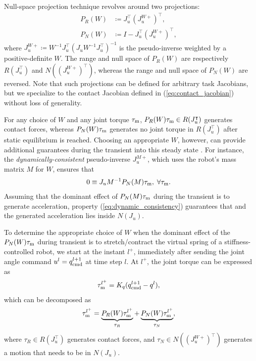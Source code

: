Null-space projection technique revolves around two projections: 
\begin{subequations}

\begin{align}
P_R(W) &\coloneqq J_u^\intercal \left(J_u^{W +}\right)^\intercal, \\
P_N(W) &\coloneqq I - J_u^\intercal \left(J_u^{W +}\right)^\intercal,
\end{align}
\end{subequations}
where $J_u^{W+} \coloneqq W^{-1} J_u^\intercal (J_u W^{-1} J_u^\intercal)^{-1}$ is the pseudo-inverse weighted by a positive-definite $W$. The range and null space of $P_R(W)$ are respectively $R(J_u^\intercal)$ and $N\left(\left(J_u^{W+}\right)^\intercal\right)$, whereas the range and null space of $P_N(W)$ are reversed. Note that such projections can be defined for arbitrary task Jacobians, but we specialize to the contact Jacobian defined in (\ref{eq:contact_jacobian}) without loss of generality.

For any choice of $W$ and any joint torque $\tauM$, $P_R(W) \tauM \in R(J_u^\intercal)$ generates contact forces, whereas $P_N(W) \tauM$ generates no joint torque in $R(J_u^\intercal)$ after static equilibrium is reached. Choosing an appropriate $W$, however, can provide additional guarantees during the transient into this steady state \cite{dietrich2015overview}. For instance, the \textit{dynamically-consistent} pseudo-inverse $J_u^{M+}$\cite{featherstone1997load}, which uses the robot's mass matrix $M$ for $W$, ensures that 
\begin{equation}
\label{eq:dynamic_consistency}
0 \equiv J_u M^{-1} P_N(M) \tauM, \; \forall \tauM.
\end{equation}
Assuming that the dominant effect of $P_N(M) \tauM$ during the transient is to generate acceleration, property (\ref{eq:dynamic_consistency}) guarantees that and the generated acceleration lies inside $N(J_u)$.

To determine the appropriate choice of $W$ when the dominant effect of the $P_N(W) \tauM$ during transient is to stretch/contract the virtual spring of a stiffness-controlled robot, we start at the instant $l^+$, immediately after sending the joint angle command $u^l = \qcmd[l+1]$ at time step $l$. At $l^+$, the joint torque can be expressed as 
\begin{equation}
\label{eq:tau_l_stiffness}
\tauM^{l^+} = K_q(\qcmd[l+1] - q^l),
\end{equation}
which can be decomposed as 
\begin{equation}
\label{eq:tau_l_decomposition}
\tauM^{l^+} = \underbrace{P_R(W) \tauM^{l^+}}_{\tau_R} + \underbrace{P_N(W) \tauM^{l^+}}_{\tau_N},
\end{equation}
where $\tau_R \in R(J_u^\intercal)$ generates contact forces, and $\tau_N \in N\left(\left(J_u^{W+}\right)^\intercal\right)$ generates a motion that needs to be in $N(J_u)$.

